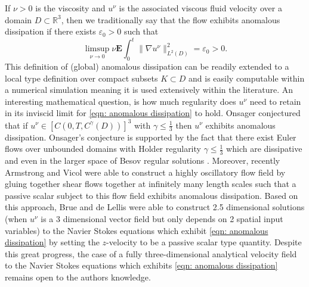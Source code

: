 \documentclass[11pt, reqno]{article}
\def\R{{\mathbb R}} %
\def\grad{\nabla}
\def\E{\mathbf{E}}
\begin{document}
If $\nu > 0$ is the viscosity and $u^\nu$ is the associated viscous fluid velocity over a domain $D \subset \R^3$, then we traditionally say that the flow exhibits anomalous dissipation if there exists $\varepsilon_0 > 0$ such that
\begin{equation}\label{eqn: anomalous dissipation}  
    \limsup_{\nu \to 0}\nu\E\int_0^t\|\grad u^\nu\|_{L^2(D)}^2 = \varepsilon_0 > 0.
\end{equation}
This definition of (global) anomalous dissipation \cite{frisch1995turbulence} can be readily extended to a local type definition over compact subsets $K \subset D$ and is easily computable within a numerical simulation meaning it is used extensively within the literature. An interesting mathematical question, is how much regularity does $u^\nu$ need to retain in its inviscid limit for \eqref{eqn: anomalous dissipation} to hold. Onsager conjectured that if $u^\nu \in [C(0,T, C^{\gamma}(D))]^3$ with $\gamma \leq \frac{1}{3}$ then $u^\nu$ exhibits anomalous dissipation. Onsager's conjecture is supported by the fact that there exist Euler flows over unbounded domains with Holder regularity $\gamma \leq \frac{1}{3}$ which are dissipative \cite{isett2018proof} and even in the larger space of Besov regular solutions \cite{novack2023intermittent}. Moreover, recently Armstrong and Vicol \cite{armstrong2023anomalous} were able to construct a highly oscillatory flow field by gluing together shear flows together at infinitely many length scales such that a passive scalar subject to this flow field exhibits anomalous dissipation. Based on this approach, Brue and de Lellis \cite{brue2023anomalous} were able to construct 2.5 dimensional solutions (when $u^\nu$ is a 3 dimensional vector field but only depends on 2 spatial input variables) to the Navier Stokes equations which exhibit \eqref{eqn: anomalous dissipation} by setting the $z$-velocity to be a passive scalar type quantity. Despite this great progress, the case of a fully three-dimensional analytical velocity field to the Navier Stokes equations which exhibits \eqref{eqn: anomalous dissipation} remains open to the authors knowledge.
\end{document}
